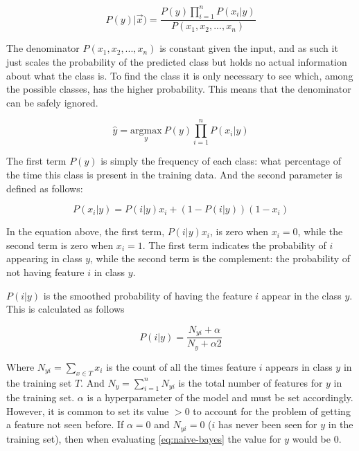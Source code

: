 \documentclass[epsfig,a4paper,11pt,titlepage,twoside,openany]{book}
\begin{document}
\begin{equation*}
    P(y) | \vec{x}) = \frac{P(y)  \prod_{i=1}^n P(x_i | y)}{P(x_1, x_2, ...,x_n)}
\end{equation*}

The denominator $P(x_1, x_2, ...,x_n)$ is constant given the input, and as such it just scales the probability of the predicted class but holds no actual information about what the class is. To find the class it is only necessary to see which, among the possible classes, has the higher probability. This means that the denominator can be safely ignored.

\begin{equation}
    \hat{y} = \underset{y}{\mathrm{argmax}}\ P(y) \prod_{i=1}^n P(x_i | y)
    \label{eq:naive-bayes}
\end{equation} 

The first term $P(y)$ is simply the frequency of each class: what percentage of the time this class is present in the training data. And the second parameter is defined as follows:

\begin{equation*}
    P(x_i | y) = P(i|y)x_i + (1 - P(i|y))(1-x_i)
\end{equation*}

In the equation above, the first term, $P(i|y)x_i$, is zero when $x_i = 0$, while the second term is zero when $x_i = 1$. The first term indicates the probability of $i$ appearing in class $y$, while the second term is the complement: the probability of not having feature $i$ in class $y$. 

$P(i|y)$ is the smoothed probability of having the feature $i$ appear in the class $y$. This is calculated as follows 

\begin{equation*}
    P(i|y) = \frac{N_{yi} + \alpha}{N_y + \alpha 2}
\end{equation*}

Where $N_{yi} = \sum_{x \in T} x_i$ is the count of all the times feature $i$ appears in class $y$ in the training set $T$. And $N_y = \sum_{i=1}^n N_{yi}$ is the total number of features for $y$ in the training set. $\alpha$ is a hyperparameter of the model and must be set accordingly. However, it is common to set its value $>0$ to account for the problem of getting a feature not seen before. If $\alpha = 0$ and $N_{yi} = 0$ ($i$ has never been seen for $y$ in the training set), then when evaluating \autoref{eq:naive-bayes} the value for $y$ would be 0.
\end{document}
